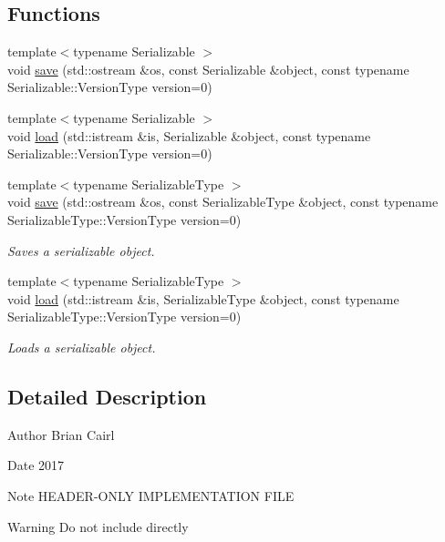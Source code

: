 \subsection*{Functions}
\begin{DoxyCompactItemize}
\item 
{\footnotesize template$<$typename Serializable $>$ }\\void \hyperlink{namespaceffnn_a1d292f830b9e27ce3965b0c18231b7fc}{save} (std\-::ostream \&os, const Serializable \&object, const typename Serializable\-::\-Version\-Type version=0)
\item 
{\footnotesize template$<$typename Serializable $>$ }\\void \hyperlink{namespaceffnn_a365753310c86d8142fa5b785cc16004a}{load} (std\-::istream \&is, Serializable \&object, const typename Serializable\-::\-Version\-Type version=0)
\item 
{\footnotesize template$<$typename Serializable\-Type $>$ }\\void \hyperlink{namespaceffnn_a25c692ab6bf9799deb7c4282ee85bdd6}{save} (std\-::ostream \&os, const Serializable\-Type \&object, const typename Serializable\-Type\-::\-Version\-Type version=0)
\begin{DoxyCompactList}\small\item\em Saves a serializable object. \end{DoxyCompactList}\item 
{\footnotesize template$<$typename Serializable\-Type $>$ }\\void \hyperlink{namespaceffnn_a94ff5b786bc42fa02bcf27ed86854a71}{load} (std\-::istream \&is, Serializable\-Type \&object, const typename Serializable\-Type\-::\-Version\-Type version=0)
\begin{DoxyCompactList}\small\item\em Loads a serializable object. \end{DoxyCompactList}\end{DoxyCompactItemize}


\subsection{Detailed Description}
\begin{DoxyAuthor}{Author}
Brian Cairl 
\end{DoxyAuthor}
\begin{DoxyDate}{Date}
2017
\end{DoxyDate}
\begin{DoxyNote}{Note}
H\-E\-A\-D\-E\-R-\/\-O\-N\-L\-Y I\-M\-P\-L\-E\-M\-E\-N\-T\-A\-T\-I\-O\-N F\-I\-L\-E 
\end{DoxyNote}
\begin{DoxyWarning}{Warning}
Do not include directly 
\end{DoxyWarning}


